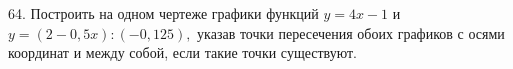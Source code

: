 64. Построить на одном чертеже графики функций $y=4x-1$ и $y=(2-0,5x): (-0,125),$
указав точки пересечения обоих графиков с осями координат и между собой, если такие точки существуют.\\
